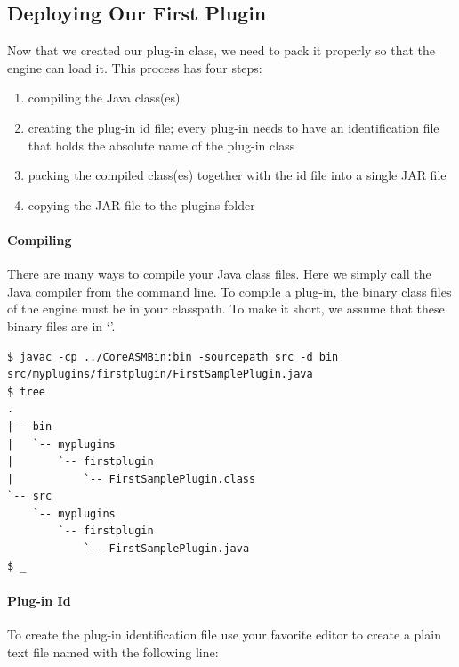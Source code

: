 \documentclass{article}
\begin{document}
\subsection{Deploying Our First Plugin}

Now that we created our plug-in class, we need to pack it properly so that the \CoreASM engine
can load it. This process has four steps:
\begin{enumerate}
	\item compiling the Java class(es)
	\item creating the plug-in id file; every \CoreASM plug-in needs to have an identification
		file that holds the absolute name of the plug-in class 
	\item packing the compiled class(es) together with the id file into a single JAR file
	\item copying the JAR file to the \CoreASM plugins folder 
\end{enumerate} 

\paragraph{Compiling} There are many ways to compile your Java class files. Here we simply call the 
Java compiler from the command line. To compile a plug-in, the binary class files of the \CoreASM engine
must be in your classpath. To make it short, we assume that these binary files are in `'.

\begin{shell}
\begin{verbatim}
$ javac -cp ../CoreASMBin:bin -sourcepath src -d bin src/myplugins/firstplugin/FirstSamplePlugin.java
$ tree 
.
|-- bin
|   `-- myplugins
|       `-- firstplugin
|           `-- FirstSamplePlugin.class
`-- src
    `-- myplugins
        `-- firstplugin
            `-- FirstSamplePlugin.java
$ _
\end{verbatim}
\end{shell}

\paragraph{Plug-in Id} To create the plug-in identification file use your favorite editor to 
create a plain text file named  with the following line:

\begin{center}\end{center}
\end{document}
